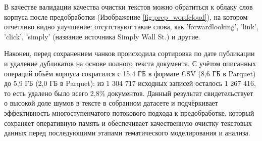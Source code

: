В качестве валидации качества очистки текстов можно обратиться к облаку слов корпуса после предобработки (Изображение \ref{fig:prep_wordcloud}),
на котором отчетливо видно улучшение: отсутствуют такие слова, как 'forwardlooking', 'link', 'click', 'simply' (название источника Simply Wall St.) и другие.

Наконец, перед сохранением чанков происходила сортировка по дате публикации и удаление дубликатов на основе полного текста документа.
С учётом описанных операций объём корпуса сократился с 15,4 ГБ в формате CSV (8,6 ГБ в Parquet) до 5,9 ГБ (2,0 ГБ в Parquet): из 1 304 717
исходных записей осталось 1 267 416, то есть удалено было всего 2,8\% документов. Данный результат свидетельствует о высокой
доле шумов в тексте в собранном датасете и подчёркивает эффективность многоступенчатого потокового подхода к предобработке,
который сохраняет оперативную память и обеспечивает качественную очистку текстовых данных перед последующими этапами
тематического моделирования и анализа.
